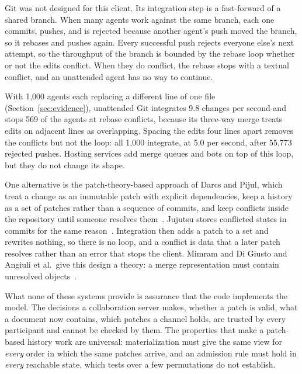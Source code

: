 Git was not designed for this client. Its integration step is a fast-forward of a shared branch. When many agents work against the same branch, each one commits, pushes, and is rejected because another agent's push moved the branch, so it rebases and pushes again. Every successful push rejects everyone else's next attempt, so the throughput of the branch is bounded by the rebase loop whether or not the edits conflict. When they do conflict, the rebase stops with a textual conflict, and an unattended agent has no way to continue.

With 1,000 agents each replacing a different line of one file (Section~\ref{sec:evidence}), unattended Git integrates 9.8 changes per second and stops 569 of the agents at rebase conflicts, because its three-way merge treats edits on adjacent lines as overlapping. Spacing the edits four lines apart removes the conflicts but not the loop: all 1,000 integrate, at 5.0 per second, after 55,773 rejected pushes. Hosting services add merge queues and bots on top of this loop, but they do not change its shape.

One alternative is the patch-theory-based approach of Darcs and Pijul, which treat a change as an immutable patch with explicit dependencies, keep a history as a set of patches rather than a sequence of commits, and keep conflicts inside the repository until someone resolves them~\cite{darcs,pijul}. Jujutsu stores conflicted states in commits for the same reason~\cite{jj}. Integration then adds a patch to a set and rewrites nothing, so there is no loop, and a conflict is data that a later patch resolves rather than an error that stops the client. Mimram and Di Giusto and Angiuli et al.\ give this design a theory: a merge representation must contain unresolved objects~\cite{patches,homotopical}.

What none of these systems provide is assurance that the code implements the model. The decisions a collaboration server makes, whether a patch is valid, what a document now contains, which patches a channel holds, are trusted by every participant and cannot be checked by them. The properties that make a patch-based history work are universal: materialization must give the same view for \emph{every} order in which the same patches arrive, and an admission rule must hold in \emph{every} reachable state, which tests over a few permutations do not establish.

